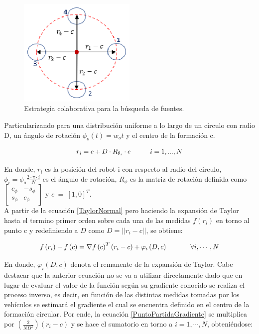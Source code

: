 \begin{figure}[htb]
\centering
\includegraphics[width=0.5\textwidth]{figures/p3.eps}
\caption{Estrategia colaborativa para la búsqueda de fuentes.} \label{Estrategia_Colaborativa}
\end{figure}

Particularizando para una distribución uniforme a lo largo de un circulo con radio D, un ángulo de rotación $\phi_o\left(t\right)=w_ot$ y el centro de la formación c. 

\begin{equation*}
	r_i = c + D\cdot{R}_{\theta_i}\cdot{e}\hspace{10mm}{i = 1,...,N}
\end{equation*}

En donde, $r_{i}$ es la posición del robot i con respecto al radio del circulo, ${\phi }_{i}=\phi_o\frac{2\cdot\pi\cdot{i}}{N}$ es el ángulo de rotación, $R_{\phi }$ es la matriz de rotación definida como $\left[ \begin{array}{cc} {c}_{\phi } & -{s}_{\phi } \\  {s}_{\phi } & {c}_{\phi } \end{array} \right]$ y  $e\ =\ {\left[1,0\right]}^T$.\\


A partir de la ecuación \ref{TaylorNormal} pero haciendo la expansión de Taylor hasta el termino primer orden sobre cada una de las medidas $f\left(r_i\right)$ en torno al punto c y redefiniendo a $D$ como $D=||r_i-c||$, se obtiene:

\begin{equation} \label{PuntoPartidaGradiente}
	f\left(r_i\right)-f\left(c\right)=\nabla{f\left(c\right)}^T\left(r_i-c\right)+\varphi_i\left(D,c\right)\hspace{12mm}\forall{i},\cdots,N
\end{equation}

En donde, $\varphi_i\left(D,c\right)$ denota el remanente de la expansión de Taylor. 
\newpage
Cabe destacar que la anterior ecuación no se va a utilizar directamente dado que en lugar de evaluar el valor de la función según su gradiente conocido se realiza el proceso inverso, es decir, en función de las distintas medidas tomadas por los vehículos se estimará el gradiente el cual se encuentra definido en el centro de la formación circular. Por ende, la ecuación \ref{PuntoPartidaGradiente} se multiplica por $\left(\frac{2}{ND^{2}}\right)\left(r_i-c\right)$ y se hace el sumatorio en torno a $i=1,\cdots,N$, obteniéndose:

